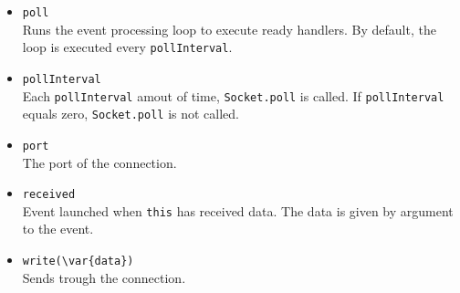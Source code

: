 \begin{itemize}
\item \lstinline|poll|\\
  Runs the event processing loop to execute ready handlers. By
  default, the loop is executed every \lstinline|pollInterval|.

\item \lstinline|pollInterval|\\
  Each \lstinline|pollInterval| amout of time, \lstinline|Socket.poll|
  is called. If \lstinline|pollInterval| equals zero,
  \lstinline|Socket.poll| is not called.

\item \lstinline|port|\\
  The port of the connection.

\item \lstinline|received|\\
  Event launched when \lstinline|this| has received data. The data is
  given by argument to the event.

\item \lstinline|write(\var{data})|\\
  Sends  trough the connection.

\end{itemize}

